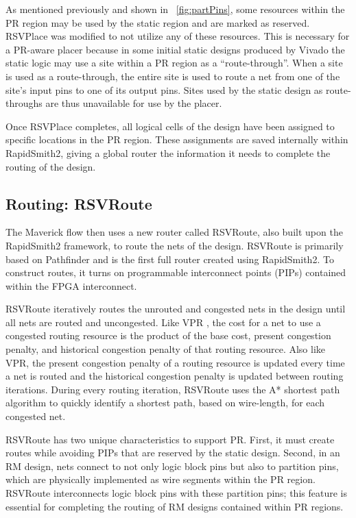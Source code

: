 As mentioned previously and shown in \figurename~\ref{fig:partPins}, some resources within the PR region may be used by the static region and are marked as reserved.
RSVPlace was modified to not utilize any of these resources.
This is necessary for a PR-aware placer because in some initial static designs produced by Vivado the static logic may use a site within a PR region as a ``route-through''.
When a site is used as a route-through, the entire site is used to route a net from one of the site's input pins to one of its output pins.
Sites used by the static design as route-throughs are thus unavailable for use by the placer.

Once RSVPlace completes, all logical cells of the design have been assigned to specific locations in the PR region.
These assignments are saved internally within RapidSmith2, giving a global router the information it needs to complete the routing of the design.

\subsection{Routing: RSVRoute}
The Maverick flow then uses a new router called RSVRoute, also built upon the RapidSmith2 framework, to route the nets of the design. 
RSVRoute is primarily based on Pathfinder \cite{Ebeling:1995} and is the first full router created using RapidSmith2.
To construct routes, it turns on programmable interconnect points (PIPs) contained within the FPGA interconnect.

RSVRoute iteratively routes the unrouted and congested nets in the design until all nets are routed and uncongested.
Like VPR \cite{Betz:1997}, the cost for a net to use a congested routing resource is the product of the base cost, present congestion penalty, and historical congestion penalty of that routing resource.
Also like VPR, the present congestion penalty of a routing resource is updated every time a net is routed and the historical congestion penalty is updated between routing
iterations.
During every routing iteration, RSVRoute uses the A* shortest path algorithm \cite{Hart:1968} to quickly identify a shortest path, based on wire-length, for each congested net.

RSVRoute has two unique characteristics to support PR.
First, it must create routes while avoiding PIPs that are reserved by the static design. 
Second, in an RM design, nets connect to not only logic block pins but also to partition pins, which are physically implemented as wire segments within the PR region.
RSVRoute interconnects logic block pins with these partition pins; this feature is essential for completing the routing of RM designs contained within PR regions.

